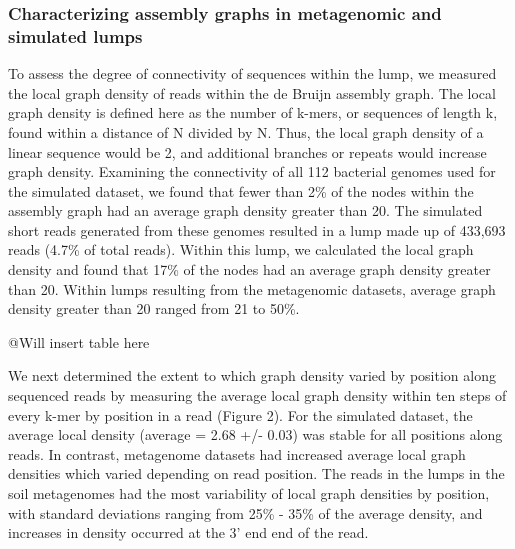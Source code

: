 \documentclass[11pt]{article} %
\begin{document}
\subsubsection{Characterizing assembly graphs in metagenomic and simulated lumps}

To assess the degree of connectivity of sequences within the lump, we measured the local graph density of reads within the de Bruijn assembly graph.  The local graph density is defined here as the number of k-mers, or sequences of length k, found within a distance of N divided by N.  Thus, the local graph density of a linear sequence would be 2, and additional branches or repeats would increase graph density.  Examining the connectivity of all 112 bacterial genomes used for the simulated dataset, we found that fewer than 2\% of the nodes within the assembly graph had an average graph density greater than 20.   The simulated short reads generated from these genomes resulted in a lump made up of 433,693 reads (4.7\% of total reads).  Within this lump, we calculated the local graph density and found that 17\% of the nodes had an average graph density greater than 20.  Within lumps resulting from the metagenomic datasets, average graph density greater than 20 ranged from 21 to 50\%.  

@Will insert table here

We next determined the extent to which graph density varied by position along sequenced reads by measuring the average local graph density within ten steps of every k-mer by position in a read (Figure 2).  For the simulated dataset, the average local density (average = 2.68 +/- 0.03) was stable for all positions along reads.  In contrast, metagenome datasets had increased average local graph densities which varied depending on read position.  The reads in the lumps in the soil metagenomes had the most variability of local graph densities by position, with standard deviations ranging from 25\% - 35\% of the average density, and increases in density occurred at the 3' end end of the read.
\end{document}
